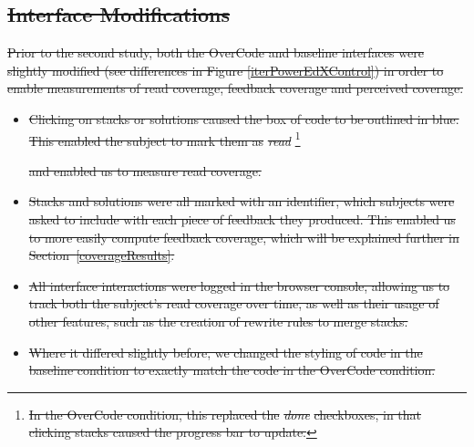 \documentclass[12pt,twoside]{mitthesis}
\providecommand{\DIFdeltex}[1]{{\protect\color{red}\sout{#1}}}                      %
\providecommand{\DIFdelbegin}{} %
\providecommand{\DIFdel}[1]{\texorpdfstring{\DIFdeltex{#1}}{}} %
\begin{document}
{{{{{{{{{{\DIFdelbegin \subsection{\DIFdel{Interface Modifications}}
\addtocounter{subsection}{-1}%
\DIFdel{Prior to the second study, both the OverCode and baseline interfaces were slightly modified (see differences in Figure \ref{iterPowerEdXControl}) in order to enable measurements of read coverage, feedback coverage and perceived coverage.
}%
 \begin{itemize} %
\item%
\DIFdel{Clicking on stacks or solutions caused the box of code to be outlined in blue. This enabled the subject to mark them as }\emph{\DIFdel{read}}%
\footnote{\DIFdel{In the OverCode condition, this replaced the }\emph{\DIFdel{done}} %
\DIFdel{checkboxes, in that clicking stacks caused the progress bar to update.}} %
\addtocounter{footnote}{-1}%
\DIFdel{and enabled us to measure read coverage.
}%
\item%
\DIFdel{Stacks and solutions were all marked with an identifier, which subjects were asked to include with each piece of feedback they produced. This enabled us to more easily compute feedback coverage, which will be explained further in Section~\ref{coverageResults}.
}%
\item%
\DIFdel{All interface interactions were logged in the browser console, allowing us to track both the subject's read coverage over time, as well as their usage of other features, such as the creation of rewrite rules to merge stacks.
}%
\item%
\DIFdel{Where it differed slightly before, we changed the styling of code in the baseline condition to exactly match the code in the OverCode condition.
}
 \end{itemize} %
}}}}}}}}}}
\end{document}
